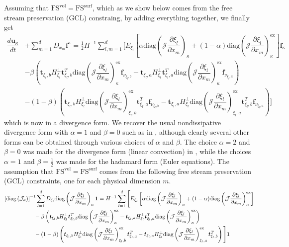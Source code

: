 \documentclass[12pt,a4paper]{article}
\newcommand{\pder}[2][]{\dfrac{\partial #1}{\partial #2}} %
\newcommand{\der}[2][]{\dfrac{d #1}{d #2}} %
\newcommand{\fn}[1]{\mathcal{#1}} %
\begin{document}
Assuming that $\text{FS}^{\text{vol}} = \text{FS}^{\text{surf}}$, which as we show below comes from the free stream preservation (GCL) constraing, by adding everything together, we finally get
\begin{align*}
\der[\bm{u}_\kappa]{t} &+ \sum_{m=1}^d D_{x_m} \bm{f}^\kappa  =  \frac{1}{2} H^{-1} \sum_{l,m=1}^d \Bigg[ E_{\xi_l} \left[ \alpha \text{diag}  \left( \fn{J} \pder[\xi_l]{x_m} \right)_{\kappa} + (1-\alpha) \text{diag}  \left( \fn{J} \pder[\xi_l]{x_m} \right)_{\kappa}^\text{ex} \right] \bm{f}_{\kappa} \\
& - \beta \left(  \bm{t}_{\xi_l, b} H^{\bot}_{\xi_l} \bm{t}_{\xi_l, b}^T \text{diag} \left( \fn{J} \pder[\xi_l]{x_m} \right)_{\kappa}^\text{ex} \bm{f}_{\nu_{\xi_l,b}} -  \bm{t}_{\xi_l, a} H^{\bot}_{\xi_l} \bm{t}_{\xi_l, a}^T \text{diag} \left( \fn{J} \pder[\xi_l]{x_m} \right)_{\kappa}^\text{ex} \bm{f}_{\nu_{\xi_l,a}} \right) \\
& - (1-\beta) \left( \bm{t}_{\xi_l, b} H^{\bot}_{\xi_l}  \text{diag} \left( \fn{J} \pder[\xi_l]{x_m} \right)_{\xi_l,b}^\text{ex} \bm{t}_{\xi_l, a}^T \bm{f}_{\nu_{\xi_l,b}} - \bm{t}_{\xi_l, a} H^{\bot}_{\xi_l} \text{diag} \left( \fn{J} \pder[\xi_l]{x_m} \right)_{\xi_l,a}^\text{ex} \bm{t}_{\xi_l, b}^T \bm{f}_{\nu_{\xi_l,a}} \right) \Bigg]
\end{align*}
which is now in a divergence form. We recover the usual nondissipative divergence form with $\alpha = 1$ and $\beta=0$ such as in \cite{del_rey_fernandez_extension_2019}, although clearly several other forms can be obtained through various choices of $\alpha$ and $\beta$. The choice $\alpha = 2$ and $\beta = 0$ was made for the divergence form (linear convection) in \cite{nolasco_optimized_2020}, while the choices $\alpha = 1$ and $\beta = \frac{1}{2}$ was made for the hadamard form (Euler equations). The assumption that  $\text{FS}^{\text{vol}} = \text{FS}^{\text{surf}}$ comes from the following free stream preservation (GCL) constraints, one for each physical dimension $m$.
\begin{align*}
 \left[ \text{diag}\left( \fn{J}_\kappa \right) \right]^{-1} \sum_{l=1}^d  D_{\xi_l} \text{diag} \left( \fn{J} \pder[\xi_l]{x_m} \right)_\kappa \bm{1} &= H^{-1} \sum_{l=1}^d \Bigg[ E_{\xi_l}  \left[ \alpha \text{diag}  \left( \fn{J} \pder[\xi_l]{x_m} \right)_{\kappa} + (1-\alpha) \text{diag}  \left( \fn{J} \pder[\xi_l]{x_m} \right)_{\kappa}^\text{ex} \right] \\
& \hspace{-4cm} - \beta \left(  \bm{t}_{\xi_l, b} H^{\bot}_{\xi_l} \bm{t}_{\xi_l, b}^T \text{diag} \left( \fn{J} \pder[\xi_l]{x_m} \right)_{\kappa}^\text{ex} - \bm{t}_{\xi_l, a} H^{\bot}_{\xi_l} \bm{t}_{\xi_l, a}^T \text{diag} \left( \fn{J} \pder[\xi_l]{x_m} \right)_{\kappa}^\text{ex} \right) \\
& \hspace{-4cm} - (1-\beta) \left( \bm{t}_{\xi_l, b} H^{\bot}_{\xi_l}  \text{diag} \left( \fn{J} \pder[\xi_l]{x_m} \right)_{\xi_l,b}^\text{ex} \bm{t}_{\xi_l, a}^T - \bm{t}_{\xi_l, a} H^{\bot}_{\xi_l} \text{diag} \left( \fn{J} \pder[\xi_l]{x_m} \right)_{\xi_l,a}^\text{ex} \bm{t}_{\xi_l, b}^T \right) \Bigg] \bm{1}
\end{align*}
\end{document}
